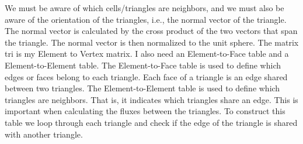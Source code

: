 We must be aware of which cells/triangles are neighbors, and we must also be aware of the orientation of the triangles, i.e., the normal vector of the triangle.
The normal vector is calculated by the cross product of the two vectors that span the triangle.
The normal vector is then normalized to the unit sphere.
The matrix tri is my Element to Vertex matrix. 
I also need an Element-to-Face table and a Element-to-Element table.
The Element-to-Face table is used to define which edges or faces belong to each triangle.
Each face of a triangle is an edge shared between two triangles.
The Element-to-Element table is used to define which triangles are neighbors. 
That is, it indicates which triangles share an edge. This is important when calculating the fluxes between the triangles.
To construct this table we loop through each triangle and check if the edge of the triangle is shared with another triangle.





